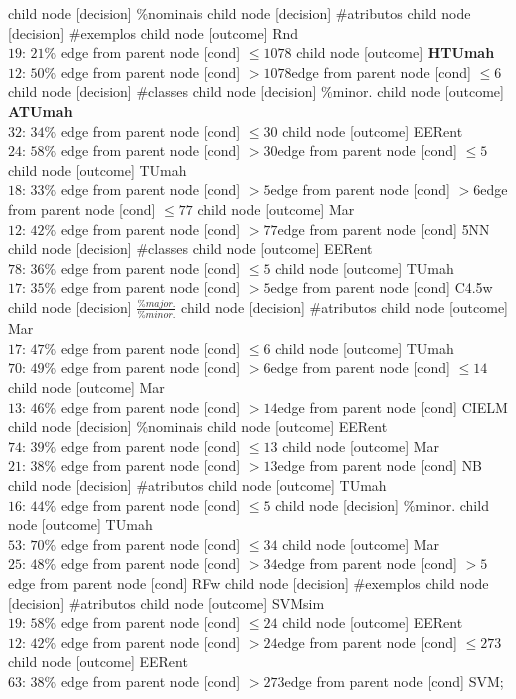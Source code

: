 child {node [decision] {\%nominais}
child {node [decision] {\#atributos}
child {node [decision] {\#exemplos}
child {node [outcome] {Rnd \\$19$: $21\%$} edge from parent node [cond] {$\leq1078$}}
child {node [outcome] {\textbf{HTUmah} \\$12$: $50\%$} edge from parent node [cond] {$>1078$}}edge from parent node [cond] {$\leq6$}}
child {node [decision] {\#classes}
child {node [decision] {\%minor.}
child {node [outcome] {\textbf{ATUmah} \\$32$: $34\%$} edge from parent node [cond] {$\leq30$}}
child {node [outcome] {EERent \\$24$: $58\%$} edge from parent node [cond] {$>30$}}edge from parent node [cond] {$\leq5$}}
child {node [outcome] {TUmah \\$18$: $33\%$} edge from parent node [cond] {$>5$}}edge from parent node [cond] {$>6$}}edge from parent node [cond] {$\leq77$}}
child {node [outcome] {Mar \\$12$: $42\%$} edge from parent node [cond] {$>77$}}edge from parent node [cond] {5NN}}
child {node [decision] {\#classes}
child {node [outcome] {EERent \\$78$: $36\%$} edge from parent node [cond] {$\leq5$}}
child {node [outcome] {TUmah \\$17$: $35\%$} edge from parent node [cond] {$>5$}}edge from parent node [cond] {C4.5w}}
child {node [decision] {$\frac{\%major.}{\%minor.}$}
child {node [decision] {\#atributos}
child {node [outcome] {Mar \\$17$: $47\%$} edge from parent node [cond] {$\leq6$}}
child {node [outcome] {TUmah \\$70$: $49\%$} edge from parent node [cond] {$>6$}}edge from parent node [cond] {$\leq14$}}
child {node [outcome] {Mar \\$13$: $46\%$} edge from parent node [cond] {$>14$}}edge from parent node [cond] {CIELM}}
child {node [decision] {\%nominais}
child {node [outcome] {EERent \\$74$: $39\%$} edge from parent node [cond] {$\leq13$}}
child {node [outcome] {Mar \\$21$: $38\%$} edge from parent node [cond] {$>13$}}edge from parent node [cond] {NB}}
child {node [decision] {\#atributos}
child {node [outcome] {TUmah \\$16$: $44\%$} edge from parent node [cond] {$\leq5$}}
child {node [decision] {\%minor.}
child {node [outcome] {TUmah \\$53$: $70\%$} edge from parent node [cond] {$\leq34$}}
child {node [outcome] {Mar \\$25$: $48\%$} edge from parent node [cond] {$>34$}}edge from parent node [cond] {$>5$}}edge from parent node [cond] {RFw}}
child {node [decision] {\#exemplos}
child {node [decision] {\#atributos}
child {node [outcome] {SVMsim \\$19$: $58\%$} edge from parent node [cond] {$\leq24$}}
child {node [outcome] {EERent \\$12$: $42\%$} edge from parent node [cond] {$>24$}}edge from parent node [cond] {$\leq273$}}
child {node [outcome] {EERent \\$63$: $38\%$} edge from parent node [cond] {$>273$}}edge from parent node [cond] {SVM}};